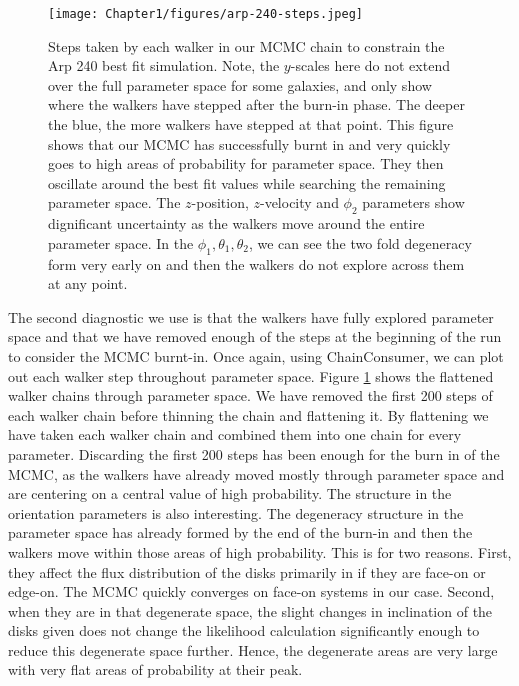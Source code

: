 \begin{figure}
\centering
\texttt{[image: Chapter1/figures/arp-240-steps.jpeg]}
\caption[Steps taken by each walker in our MCMC chain to constrain the Arp 240 best fit simulation.]{Steps taken by each walker in our MCMC chain to constrain the Arp 240 best fit simulation. Note, the $y$-scales here do not extend over the full parameter space for some galaxies, and only show where the walkers have stepped after the burn-in phase. The deeper the blue, the more walkers have stepped at that point. This figure shows that our MCMC has successfully burnt in and very quickly goes to high areas of probability for parameter space. They then oscillate around the best fit values while searching the remaining parameter space. The $z$-position, $z$-velocity and $\phi_{2}$ parameters show dignificant uncertainty as the walkers move around the entire parameter space. In the $\phi_{1}, \theta_{1}, \theta_{2}$, we can see the two fold degeneracy form very early on and then the walkers do not explore across them at any point.}
\label{fig:walker_steps}
\end{figure}

The second diagnostic we use is that the walkers have fully explored parameter space and that we have removed enough of the steps at the beginning of the run to consider the MCMC burnt-in. Once again, using ChainConsumer, we can plot out each walker step throughout parameter space. Figure \ref{fig:walker_steps} shows the flattened walker chains through parameter space. We have removed the first 200 steps of each walker chain before thinning the chain and flattening it. By flattening we have taken each walker chain and combined them into one chain for every parameter. Discarding the first 200 steps has been enough for the burn in of the MCMC, as the walkers have already moved mostly through parameter space and are centering on a central value of high probability. The structure in the orientation parameters is also interesting. The degeneracy structure in the parameter space has already formed by the end of the burn-in and then the walkers move within those areas of high probability. This is for two reasons. First, they affect the flux distribution of the disks primarily in if they are face-on or edge-on. The MCMC quickly converges on face-on systems in our case. Second, when they are in that degenerate space, the slight changes in inclination of the disks given does not change the likelihood calculation significantly enough to reduce this degenerate space further. Hence, the degenerate areas are very large with very flat areas of probability at their peak.


